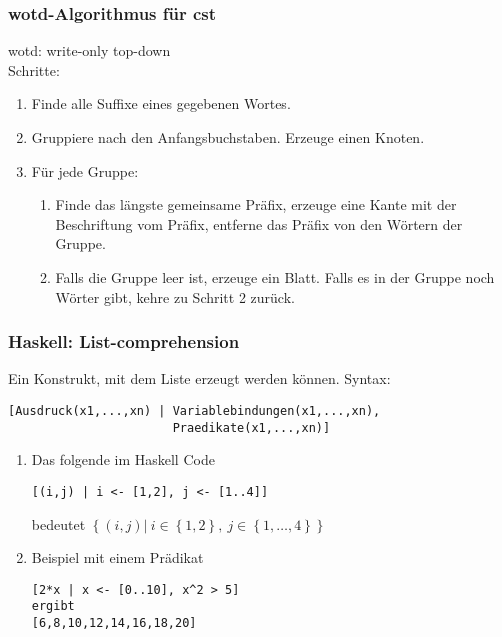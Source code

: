 \documentclass{beamer}
\begin{document}
\begin{frame}[t]
\frametitle{wotd-Algorithmus für cst}
    wotd: write-only top-down\\
    \medskip
    Schritte:
    \begin{enumerate}
        \item Finde alle Suffixe eines gegebenen Wortes.
        \item Gruppiere nach den Anfangsbuchstaben. Erzeuge einen Knoten.
        \item Für jede Gruppe:
        \begin{enumerate}
            \item Finde das längste gemeinsame Präfix, erzeuge eine Kante mit der Beschriftung vom Präfix, entferne das Präfix von den Wörtern der Gruppe.
            \item Falls die Gruppe leer ist, erzeuge ein Blatt. Falls es in der Gruppe noch Wörter gibt, kehre zu Schritt 2 zurück.
        \end{enumerate}
    \end{enumerate}
\end{frame}

\begin{frame}[fragile]
\frametitle{Haskell: List-comprehension}  
Ein Konstrukt, mit dem Liste erzeugt werden können. Syntax:
\begin{lstlisting}
[Ausdruck(x1,...,xn) | Variablebindungen(x1,...,xn),
                       Praedikate(x1,...,xn)]
\end{lstlisting}
\begin{examples}
\begin{enumerate}
\item Das folgende im Haskell Code
\begin{lstlisting}
[(i,j) | i <- [1,2], j <- [1..4]] 
\end{lstlisting}
bedeutet $\left\{\left(i,j\right)\vert \: i \in \left\{1, 2\right\}, \: j \in \left\{1, \dots, 4\right\}\right\}$
\item Beispiel mit einem Prädikat
\begin{lstlisting}
[2*x | x <- [0..10], x^2 > 5]
ergibt
[6,8,10,12,14,16,18,20]
\end{lstlisting}
\end{enumerate}
\end{examples}
\bigskip   
\end{frame}
\end{document}
